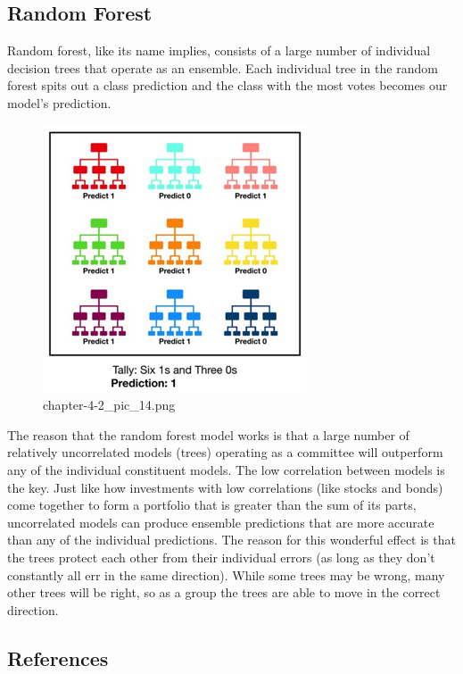 \documentclass[11pt]{article}
\makeatletter
\newcommand{\boxspacing}{\kern\kvtcb@left@rule\kern\kvtcb@boxsep}
\newcommand{\prompt}[4]{
        {\ttfamily\llap{{\color{#2}[#3]:\hspace{3pt}#4}}\vspace{-\baselineskip}}
    }
\makeatother
\begin{document}
    \hypertarget{random-forest}{%
\subsection{Random Forest}\label{random-forest}}

    Random forest, like its name implies, consists of a large number of
individual decision trees that operate as an ensemble. Each individual
tree in the random forest spits out a class prediction and the class
with the most votes becomes our model's prediction.

    \begin{figure}
\centering
\includegraphics{./pic/chapter-4-2_pic_14.png}
\caption{chapter-4-2\_pic\_14.png}
\end{figure}

    The reason that the random forest model works is that a large number of
relatively uncorrelated models (trees) operating as a committee will
outperform any of the individual constituent models. The low correlation
between models is the key. Just like how investments with low
correlations (like stocks and bonds) come together to form a portfolio
that is greater than the sum of its parts, uncorrelated models can
produce ensemble predictions that are more accurate than any of the
individual predictions. The reason for this wonderful effect is that the
trees protect each other from their individual errors (as long as they
don't constantly all err in the same direction). While some trees may be
wrong, many other trees will be right, so as a group the trees are able
to move in the correct direction.

    \hypertarget{references}{%
\subsection{References}\label{references}}

    \begin{tcolorbox}[breakable, size=fbox, boxrule=1pt, pad at break*=1mm,colback=cellbackground, colframe=cellborder]
\prompt{In}{incolor}{ }{\boxspacing}
\begin{Verbatim}[commandchars=\\\{\}]

\end{Verbatim}
\end{tcolorbox}


    
    
    
\end{document}
